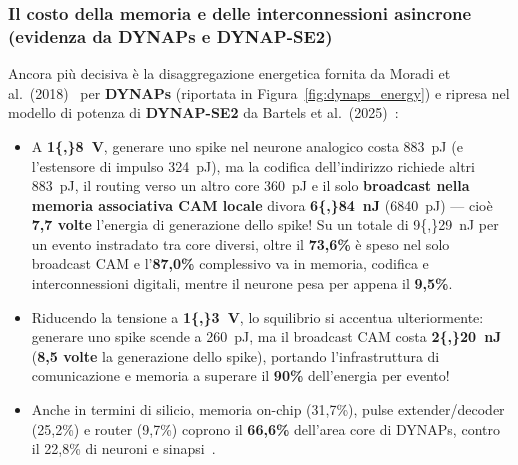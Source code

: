 \subsubsection{Il costo della memoria e delle interconnessioni asincrone (evidenza da DYNAPs e DYNAP-SE2)}
Ancora più decisiva è la disaggregazione energetica fornita da Moradi et al.\ (2018)~\cite{moradi2018} per \textbf{DYNAPs} (riportata in Figura~\ref{fig:dynaps_energy}) e ripresa nel modello di potenza di \textbf{DYNAP-SE2} da Bartels et al.\ (2025)~\cite{bartels2025}:
\begin{itemize}
  \item A \textbf{\SI{1{,}8}{\volt}}, generare uno spike nel neurone analogico costa \SI{883}{\pico\joule} (e l'estensore di impulso \SI{324}{\pico\joule}), ma la codifica dell'indirizzo richiede altri \SI{883}{\pico\joule}, il routing verso un altro core \SI{360}{\pico\joule} e il solo \textbf{broadcast nella memoria associativa CAM locale} divora \textbf{\SI{6{,}84}{\nano\joule}} (\SI{6840}{\pico\joule}) — cioè \textbf{7,7 volte} l'energia di generazione dello spike! Su un totale di \SI{9{,}29}{\nano\joule} per un evento instradato tra core diversi, oltre il \textbf{73,6\%} è speso nel solo broadcast CAM e l'\textbf{87,0\%} complessivo va in memoria, codifica e interconnessioni digitali, mentre il neurone pesa per appena il \textbf{9,5\%}.
  \item Riducendo la tensione a \textbf{\SI{1{,}3}{\volt}}, lo squilibrio si accentua ulteriormente: generare uno spike scende a \SI{260}{\pico\joule}, ma il broadcast CAM costa \textbf{\SI{2{,}20}{\nano\joule}} (\textbf{8,5 volte} la generazione dello spike), portando l'infrastruttura di comunicazione e memoria a superare il \textbf{90\%} dell'energia per evento!
  \item Anche in termini di silicio, memoria on-chip (31,7\%), pulse extender/decoder (25,2\%) e router (9,7\%) coprono il \textbf{66,6\%} dell'area core di DYNAPs, contro il 22,8\% di neuroni e sinapsi~\cite{moradi2018}.
\end{itemize}

